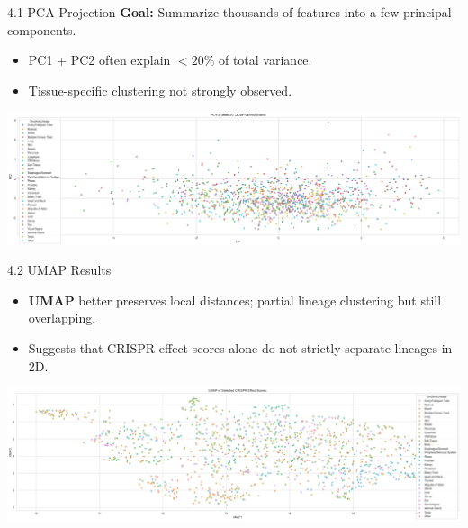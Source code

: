 \documentclass[10pt]{beamer}
\begin{document}
\begin{frame}{4.1 PCA Projection}
  \textbf{Goal:} Summarize thousands of features into a few principal components.
  \begin{itemize}
    \item PC1 + PC2 often explain $< 20\%$ of total variance.
    \item Tissue-specific clustering not strongly observed.
  \end{itemize}
  \vspace{0.2cm}
  \begin{center}
    \includegraphics[width=1\linewidth]{figs/pca_projection.png}
  \end{center}
\end{frame}

\begin{frame}{4.2 UMAP Results}
  \begin{itemize}
    \item \textbf{UMAP} better preserves local distances; partial lineage clustering but still overlapping.
    \item Suggests that CRISPR effect scores alone do not strictly separate lineages in 2D.
  \end{itemize}
  \vspace{0.3cm}
  \begin{center}
    \includegraphics[width=1\linewidth]{figs/umap_projection.png}
  \end{center}
\end{frame}

\end{document}
